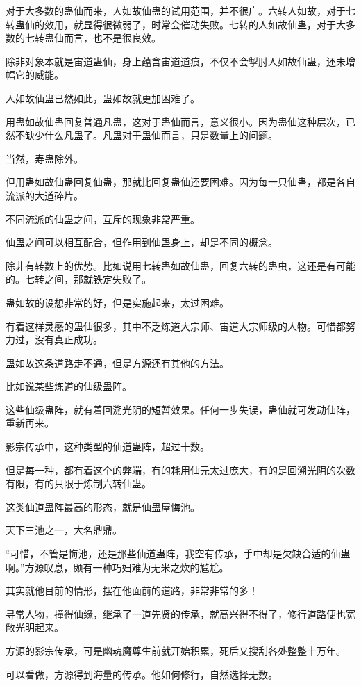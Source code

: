 \begin{this_body}
对于大多数的蛊仙而来，人如故仙蛊的试用范围，并不很广。六转人如故，对于七转蛊仙的效用，就显得很微弱了，时常会催动失败。七转的人如故仙蛊，对于大多数的七转蛊仙而言，也不是很良效。

除非对象本就是宙道蛊仙，身上蕴含宙道道痕，不仅不会掣肘人如故仙蛊，还未增幅它的威能。

人如故仙蛊已然如此，蛊如故就更加困难了。

用蛊如故仙蛊回复普通凡蛊，这对于蛊仙而言，意义很小。因为蛊仙这种层次，已然不缺少什么凡蛊了。凡蛊对于蛊仙而言，只是数量上的问题。

当然，寿蛊除外。

但用蛊如故仙蛊回复仙蛊，那就比回复蛊仙还要困难。因为每一只仙蛊，都是各自流派的大道碎片。

不同流派的仙蛊之间，互斥的现象非常严重。

仙蛊之间可以相互配合，但作用到仙蛊身上，却是不同的概念。

除非有转数上的优势。比如说用七转蛊如故仙蛊，回复六转的蛊虫，这还是有可能的。七转之间，那就铁定失败了。

蛊如故的设想非常的好，但是实施起来，太过困难。

有着这样灵感的蛊仙很多，其中不乏炼道大宗师、宙道大宗师级的人物。可惜都努力过，没有真正成功。

蛊如故这条道路走不通，但是方源还有其他的方法。

比如说某些炼道的仙级蛊阵。

这些仙级蛊阵，就有着回溯光阴的短暂效果。任何一步失误，蛊仙就可发动仙阵，重新再来。

影宗传承中，这种类型的仙道蛊阵，超过十数。

但是每一种，都有着这个的弊端，有的耗用仙元太过庞大，有的是回溯光阴的次数有限，有的只限于炼制六转仙蛊。

这类仙道蛊阵最高的形态，就是仙蛊屋悔池。

天下三池之一，大名鼎鼎。

“可惜，不管是悔池，还是那些仙道蛊阵，我空有传承，手中却是欠缺合适的仙蛊啊。”方源叹息，颇有一种巧妇难为无米之炊的尴尬。

其实就他目前的情形，摆在他面前的道路，非常非常的多！

寻常人物，撞得仙缘，继承了一道先贤的传承，就高兴得不得了，修行道路便也宽敞光明起来。

方源的影宗传承，可是幽魂魔尊生前就开始积累，死后又搜刮各处整整十万年。

可以看做，方源得到海量的传承。他如何修行，自然选择无数。


\end{this_body}
